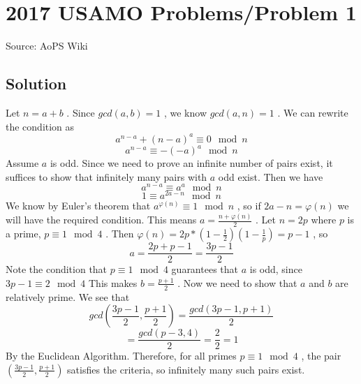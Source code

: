 \documentclass[12pt]{article}
\begin{document}
\section*{{2017 USAMO Problems/Problem 1}}
Source: AoPS Wiki

\subsection*{Solution}
Let $n=a+b$ . Since $gcd(a,b)=1$ , we know $gcd(a,n)=1$ . We can rewrite the condition as \[a^{n-a}+(n-a)^a \equiv 0 \mod{n}\] \[a^{n-a}\equiv-(-a)^a \mod{n}\] Assume $a$ is odd. Since we need to prove an infinite number of pairs exist, it suffices to show that infinitely many pairs with $a$ odd exist. Then we have \[a^{n-a}\equiv a^a \mod{n}\] \[1 \equiv a^{2a-n} \mod{n}\] We know by Euler's theorem that $a^{\varphi(n)} \equiv 1 \mod{n}$ , so if $2a-n=\varphi(n)$ we will have the required condition. This means $a=\frac{n+\varphi(n)}{2}$ . Let $n=2p$ where $p$ is a prime, $p\equiv 1\mod{4}$ . Then $\varphi(n) = 2p*\left(1-\frac{1}{2}\right)\left(1-\frac{1}{p}\right) = p-1$ , so \[a = \frac{2p+p-1}{2} = \frac{3p-1}{2}\] Note the condition that $p\equiv 1\mod{4}$ guarantees that $a$ is odd, since $3p-1 \equiv 2\mod{4}$ This makes $b = \frac{p+1}{2}$ . Now we need to show that $a$ and $b$ are relatively prime. We see that \[gcd\left(\frac{3p-1}{2},\frac{p+1}2\right)=\frac{gcd(3p-1,p+1)}{2}\] \[=\frac{gcd(p-3,4)}{2}=\frac22=1\] By the Euclidean Algorithm. Therefore, for all primes $p \equiv 1\mod{4}$ , the pair $\left(\frac{3p-1}{2},\frac{p+1}{2}\right)$ satisfies the criteria, so infinitely many such pairs exist.
\end{document}
